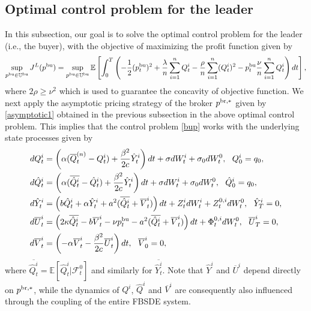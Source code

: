 \documentclass[11pt]{article}
\numberwithin{equation}{section}
\begin{document}
\subsection{Optimal control problem for the leader}
In this subsection, our goal is to solve the optimal control problem for the leader (i.e., the buyer), with the objective of maximizing the profit function given by
\begin{align}\label{bup}
\sup_{p^{{\rm bu}}\in\mathbb{U}^{\rm bu}}J^L(p^{{\rm bu}})=\sup_{p^{{\rm bu}}\in\mathbb{U}^{\rm bu}}\mathbb{E}\left[\int_0^T\left(-\frac{1}{2}(p_t^{{\rm bu}})^2+\frac{\lambda}{n}\sum_{i=1}^nQ_t^i-\frac{\rho}{n}\sum_{i=1}^n( Q_t^i)^2-p_t^{{\rm bu}}\frac{\nu }{n}\sum_{i=1}^nQ_t^i\right)dt\right],
\end{align}
where $2\rho\geq\nu^2$ which is used to guarantee the concavity of objective function. We next apply the asymptotic pricing strategy of the broker $p^{{\rm br},*}$ given by \eqref{asymptotic1} obtained in the previous subsection in the above optimal control problem. This implies that the control problem \eqref{bup} works with the underlying state processes given by
\begin{align}\label{statebu}
dQ_t^i&=\left(\alpha(\overline{Q}_t^{(n)}-Q_t^i)+\frac{\beta^2}{2c}\hat{Y}_t^i\right)dt+\sigma dW_t^i+\sigma_0dW_t^0,~~ Q_0^i=q_0,\nonumber\\
 d\hat{Q}_t^i&=\left(\alpha(\overline{\hat{Q}_t^i}-\hat{Q}_t^i)+\frac{\beta^2}{2c}\hat{Y}_t^i\right)dt+\sigma dW_t^i+\sigma_0dW_t^0,~~ \hat{Q}_0^i=q_0,\nonumber\\
d\hat{Y}_t^i&=\left(b\hat{Q}_t^i+\alpha \hat{Y}_t^i+a^2(\overline{\hat{Q}_t^i}+\overline{V}_t^i)\right)dt+Z_t^idW_t^i+Z_t^{0,i}dW_t^0,~~ \hat{Y}_T^i=0,\\
d\overline{U}_t^i&=\left(2\kappa \overline{\hat{Q}_t^i}-b\overline{V}_t^i-\nu p_t^{{\rm bu}}-a^2(\overline{\hat{Q}_t^i}+\overline{V}_t^i)\right)dt+\Phi_t^{0,i}dW_t^0,~~ \overline{U}_T^i=0,\nonumber\\
d\overline{V}_t^i&=\left(-\alpha \overline{V}_t^i-\frac{\beta^2}{2c}\overline{U}_t^i\right)dt,~~ \overline{V}_0^i=0,\nonumber
\end{align}
where $\overline{\hat{Q}_t^i}=\mathbb{E}[\hat{Q}_t^i|\mathcal{F}_t^0]$ and similarly for $\overline{\hat{Y}_t^i}$. Note that $\hat{Y}^i$ and $\overline{U}^i$ depend directly on $p^{{\rm br},*}$, while the dynamics of $Q^i$, $\hat{Q}^i$ and $\overline{V}^i$ are consequently also influenced through the coupling of the entire FBSDE system.
\end{document}
